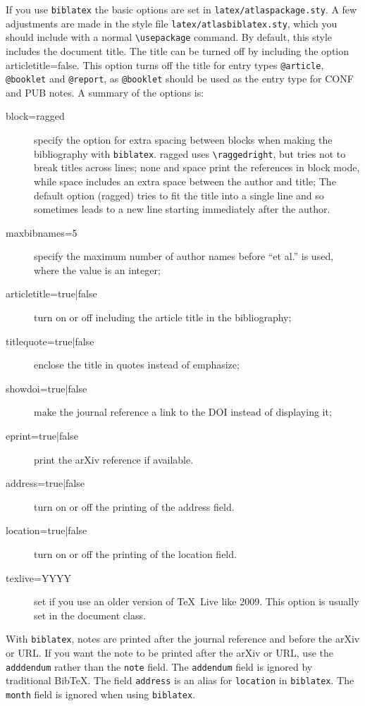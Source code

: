 \documentclass[UKenglish, texlive=2016]{\ATLASLATEXPATH atlasdoc}
\newcommand*{\BibTeX}{Bib\TeX}
\newcommand{\Macro}[1]{\texttt{\textbackslash #1}\xspace}
\newcommand{\Option}[1]{\textsf{#1}\xspace}
\newcommand{\Package}[1]{\texttt{#1}\xspace}
\begin{document}
If you use \Package{biblatex} the basic options are set in \Package{latex/atlaspackage.sty}.
A few adjustments are made in the style file \Package{latex/atlasbiblatex.sty},
which you should include with a normal \Macro{usepackage} command.
By default, this style includes the document title.
The title can be turned off by including the option \Option{articletitle=false}.
This option turns off the title for entry types \texttt{@article}, \texttt{@booklet} and \texttt{@report},
as \texttt{@booklet} should be used as the entry type for CONF and PUB notes.
A summary of the options is:
\begin{description}
\item[\Option{block=ragged}] specify the option for extra spacing between blocks when making the bibliography with \Package{biblatex}.
  \Option{ragged} uses \Macro{raggedright}, but tries not to break titles across lines;
  \Option{none} and \Option{space} print the references in block mode, while \Option{space} includes an extra space between the author and title;
  The default option (\Option{ragged}) tries to fit the title into a single line
  and so sometimes leads to a new line starting immediately after the author.
\item[\Option{maxbibnames=5}] specify the maximum number of author names before \enquote{et al.} is used, where the value is an integer;
\item[\Option{articletitle=true|{\normalfont false}}] turn on or off including the article title in the bibliography;
\item[\Option{titlequote={\normalfont true}|false}] enclose the title in quotes instead of emphasize;
\item[\Option{showdoi={\normalfont true}|false}] make the journal reference a link to the DOI instead of displaying it;
\item[\Option{eprint=true|{\normalfont false}}] print the arXiv reference if available.
\item[\Option{address={\normalfont true}|false}] turn on or off the printing of the address field.
\item[\Option{location={\normalfont true}|false}] turn on or off the printing of the location field.
\item[\Option{texlive=YYYY}] set if you use an older version of \TeX\ Live like 2009.
  This option is usually set in the document class.
\end{description}

With \Package{biblatex}, notes are printed after the journal reference and before the arXiv or URL.
If you want the note to be printed after the arXiv or URL, use the \texttt{adddendum} rather than the \texttt{note} field.
The \texttt{addendum} field is ignored by traditional \BibTeX.
The field \texttt{address} is an alias for \texttt{location} in \Package{biblatex}.
The \texttt{month} field is ignored when using \Package{biblatex}.
\end{document}
